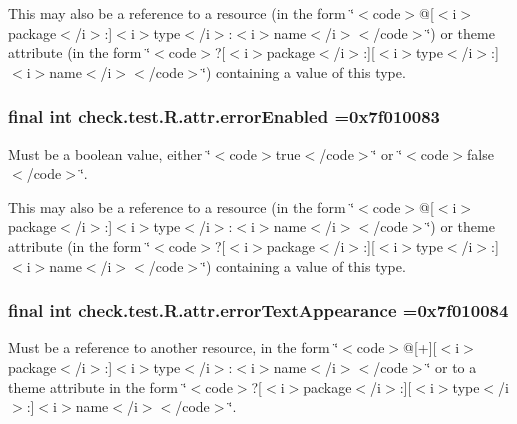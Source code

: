 This may also be a reference to a resource (in the form \char`\"{}$<$code$>$@\mbox{[}$<$i$>$package$<$/i$>$\+:\mbox{]}$<$i$>$type$<$/i$>$\+:$<$i$>$name$<$/i$>$$<$/code$>$\char`\"{}) or theme attribute (in the form \char`\"{}$<$code$>$?\mbox{[}$<$i$>$package$<$/i$>$\+:\mbox{]}\mbox{[}$<$i$>$type$<$/i$>$\+:\mbox{]}$<$i$>$name$<$/i$>$$<$/code$>$\char`\"{}) containing a value of this type. \hypertarget{classcheck_1_1test_1_1_r_1_1attr_ab02dbe7a6470efb4a4d469eeea265e7f}{}
\subsubsection[{error\+Enabled}]{\setlength{\rightskip}{0pt plus 5cm}final int check.\+test.\+R.\+attr.\+error\+Enabled =0x7f010083\hspace{0.3cm}{\ttfamily [static]}}\label{classcheck_1_1test_1_1_r_1_1attr_ab02dbe7a6470efb4a4d469eeea265e7f}
Must be a boolean value, either \char`\"{}$<$code$>$true$<$/code$>$\char`\"{} or \char`\"{}$<$code$>$false$<$/code$>$\char`\"{}. 

This may also be a reference to a resource (in the form \char`\"{}$<$code$>$@\mbox{[}$<$i$>$package$<$/i$>$\+:\mbox{]}$<$i$>$type$<$/i$>$\+:$<$i$>$name$<$/i$>$$<$/code$>$\char`\"{}) or theme attribute (in the form \char`\"{}$<$code$>$?\mbox{[}$<$i$>$package$<$/i$>$\+:\mbox{]}\mbox{[}$<$i$>$type$<$/i$>$\+:\mbox{]}$<$i$>$name$<$/i$>$$<$/code$>$\char`\"{}) containing a value of this type. \hypertarget{classcheck_1_1test_1_1_r_1_1attr_a8e9145212f04c891aeee85ee7abbd939}{}
\subsubsection[{error\+Text\+Appearance}]{\setlength{\rightskip}{0pt plus 5cm}final int check.\+test.\+R.\+attr.\+error\+Text\+Appearance =0x7f010084\hspace{0.3cm}{\ttfamily [static]}}\label{classcheck_1_1test_1_1_r_1_1attr_a8e9145212f04c891aeee85ee7abbd939}
Must be a reference to another resource, in the form \char`\"{}$<$code$>$@\mbox{[}+\mbox{]}\mbox{[}$<$i$>$package$<$/i$>$\+:\mbox{]}$<$i$>$type$<$/i$>$\+:$<$i$>$name$<$/i$>$$<$/code$>$\char`\"{} or to a theme attribute in the form \char`\"{}$<$code$>$?\mbox{[}$<$i$>$package$<$/i$>$\+:\mbox{]}\mbox{[}$<$i$>$type$<$/i$>$\+:\mbox{]}$<$i$>$name$<$/i$>$$<$/code$>$\char`\"{}. \hypertarget{classcheck_1_1test_1_1_r_1_1attr_a4e579a55463671fe043ac88526bf948b}{}
